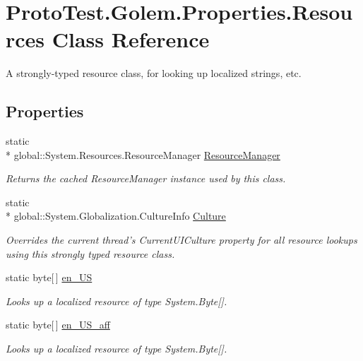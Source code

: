 \hypertarget{class_proto_test_1_1_golem_1_1_properties_1_1_resources}{\section{Proto\-Test.\-Golem.\-Properties.\-Resources Class Reference}
\label{class_proto_test_1_1_golem_1_1_properties_1_1_resources}
}


A strongly-\/typed resource class, for looking up localized strings, etc.  


\subsection*{Properties}
\begin{DoxyCompactItemize}
\item 
static \\*
global\-::\-System.\-Resources.\-Resource\-Manager \hyperlink{class_proto_test_1_1_golem_1_1_properties_1_1_resources_a9809cab615512da47ec45e295ad3b97a}{Resource\-Manager}
\begin{DoxyCompactList}\small\item\em Returns the cached Resource\-Manager instance used by this class. \end{DoxyCompactList}\item 
static \\*
global\-::\-System.\-Globalization.\-Culture\-Info \hyperlink{class_proto_test_1_1_golem_1_1_properties_1_1_resources_ac4056390f5455ac9589883e5561ed640}{Culture}
\begin{DoxyCompactList}\small\item\em Overrides the current thread's Current\-U\-I\-Culture property for all resource lookups using this strongly typed resource class. \end{DoxyCompactList}\item 
static byte\mbox{[}$\,$\mbox{]} \hyperlink{class_proto_test_1_1_golem_1_1_properties_1_1_resources_a01eeb504f28688500d6e942e0a02ec3d}{en\-\_\-\-U\-S}
\begin{DoxyCompactList}\small\item\em Looks up a localized resource of type System.\-Byte\mbox{[}\mbox{]}. \end{DoxyCompactList}\item 
static byte\mbox{[}$\,$\mbox{]} \hyperlink{class_proto_test_1_1_golem_1_1_properties_1_1_resources_abb898af626ae002fedc0fdc487741064}{en\-\_\-\-U\-S\-\_\-aff}
\begin{DoxyCompactList}\small\item\em Looks up a localized resource of type System.\-Byte\mbox{[}\mbox{]}. \end{DoxyCompactList}\end{DoxyCompactItemize}


